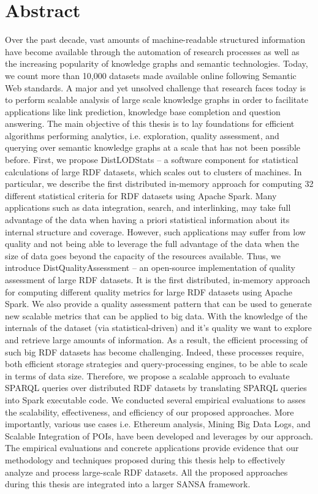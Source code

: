 \chapter*{Abstract}

Over the past decade, vast amounts of machine-readable structured information have become available through the automation of research processes as well as the increasing popularity of knowledge graphs and semantic technologies. 
Today, we count more than 10,000 datasets made available online following Semantic Web standards.
A major and yet unsolved challenge that research faces today is to perform scalable analysis of large scale knowledge graphs in order to facilitate applications like link prediction, knowledge base completion and question answering.
The main objective of this thesis is to lay foundations for efficient algorithms performing analytics, i.e. exploration, quality assessment, and querying over semantic knowledge graphs at a scale that has not been possible before.
First, we propose DistLODStats -- a software component for statistical calculations of large RDF datasets, which scales out to clusters of machines. 
In particular, we describe the first distributed in-memory approach for computing 32 different statistical criteria for RDF datasets using Apache Spark.
Many applications such as data integration, search, and interlinking, may take full advantage of the data when having a priori statistical information about its internal structure and coverage.
However, such applications may suffer from low quality and not being able to leverage the full advantage of the data when the size of data goes beyond the capacity of the resources available.
Thus, we introduce DistQualityAssessment -- an open-source 
implementation of quality assessment of large RDF datasets.
It is the first distributed, in-memory approach for computing different quality metrics for large RDF datasets using Apache Spark. We also provide a quality assessment pattern that can be used to generate new scalable metrics that can be applied to big data.
With the knowledge of the internals of the dataset (via statistical-driven) and it's quality we want to explore and retrieve large amounts of information.
As a result, the efficient processing of such big RDF datasets has become challenging.
Indeed, these processes require, both efficient storage strategies and query-processing engines, to be able to scale in terms of data size.
Therefore, we propose a scalable approach to evaluate SPARQL queries over distributed RDF datasets by translating SPARQL queries into Spark executable code.
We conducted several empirical evaluations to asses the scalability, effectiveness, and efficiency of our proposed approaches.
More importantly, various use cases i.e. Ethereum analysis, Mining Big Data Logs, and Scalable Integration of POIs, have been developed and leverages by our approach. 
The empirical evaluations and concrete applications provide evidence that our methodology and techniques proposed during this thesis help to effectively analyze and process large-scale RDF datasets.
All the proposed approaches during this thesis are integrated into a larger SANSA framework.

